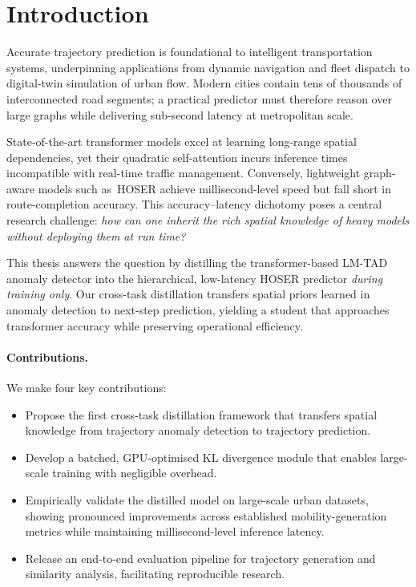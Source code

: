 \section{Introduction}
\label{sec:introduction}

Accurate trajectory prediction is foundational to intelligent transportation systems, underpinning applications from dynamic navigation and fleet dispatch to digital-twin simulation of urban flow.  Modern cities contain tens of thousands of interconnected road segments; a practical predictor must therefore reason over large graphs 
while delivering sub-second latency at metropolitan scale.

State-of-the-art transformer models excel at learning long-range spatial dependencies, yet their quadratic self-attention incurs inference times incompatible with real-time traffic management.  Conversely, lightweight graph-aware models such as\ HOSER achieve millisecond-level speed but fall short in route-completion accuracy.  This accuracy–latency dichotomy poses a central research challenge: \emph{how can one inherit the rich spatial knowledge of heavy models without deploying them at run time?}

This thesis answers the question by distilling the transformer-based LM-TAD anomaly detector into the hierarchical, low-latency HOSER predictor \emph{during training only}.  Our cross-task distillation transfers spatial priors learned in anomaly detection to next-step prediction, yielding a student that approaches transformer accuracy while preserving operational efficiency.

\paragraph{Contributions.}  We make four key contributions:
\begin{itemize}
  \item Propose the first cross-task distillation framework that transfers spatial knowledge from trajectory anomaly detection to trajectory prediction.
  \item Develop a batched, GPU-optimised KL divergence module that enables large-scale training with negligible overhead.
  \item Empirically validate the distilled model on large-scale urban datasets, showing pronounced improvements across established mobility-generation metrics while maintaining millisecond-level inference latency.
  \item Release an end-to-end evaluation pipeline for trajectory generation and similarity analysis, facilitating reproducible research.
\end{itemize}

